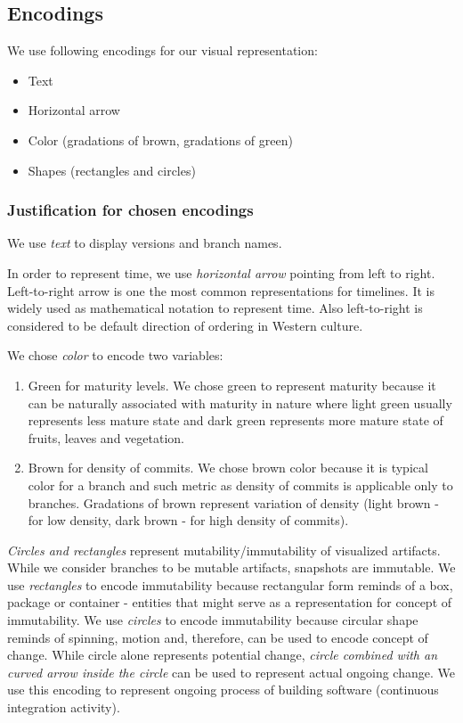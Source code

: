 \documentclass[journal]{vgtc}                %
\begin{document}
\subsection{Encodings}
We use following encodings for our visual representation:
\begin{itemize}[noitemsep,topsep=0pt]
\item Text
\item Horizontal arrow
\item Color (gradations of brown, gradations of green)
\item Shapes (rectangles and circles)
\end{itemize}
\subsubsection{Justification for chosen encodings}

We use \textit{text} to display versions and branch names.

In order to represent time, we use \textit{horizontal arrow} pointing from left to right. Left-to-right arrow is one the most common representations for timelines. It is widely used as mathematical notation to represent time. Also left-to-right is considered to be default direction of ordering in Western culture.

We chose \textit{color} to encode two variables: 
\begin{enumerate}[noitemsep,topsep=0pt]
\item {\color{Green}Green} for maturity levels. We chose green to represent maturity because it can be naturally associated with maturity in nature where light green usually represents less mature state and dark green represents more mature state of fruits, leaves and vegetation.
\item {\color{Brown}Brown} for density of commits. We chose brown color because it is typical color for a branch and such metric as density of commits is applicable only to branches. Gradations of brown represent variation of density (light brown - for low density, dark brown - for high density of commits). 
\end{enumerate}

\textit{Circles and rectangles} represent mutability/immutability of visualized artifacts. While we consider branches to be mutable artifacts, snapshots are immutable. We use \textit{rectangles} to encode immutability because rectangular form reminds of a box, package or container - entities that might serve as a representation for concept of immutability. We use \textit{circles} to encode immutability because circular shape reminds of spinning, motion and, therefore, can be used to encode concept of change. While circle alone represents potential change, \textit{circle combined with an curved arrow inside the circle} can be used to represent actual ongoing change. We use this encoding to represent ongoing process of building software (continuous integration activity).
\end{document}
